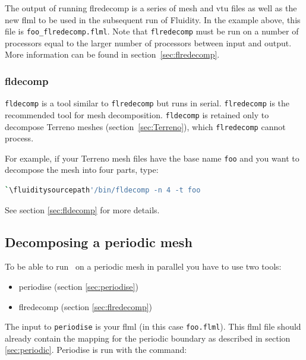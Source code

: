 The output of running flredecomp is a series of mesh and vtu files as well
as the new flml to be used in the subsequent run of Fluidity.  In the example above, this file is \lstinline+foo_flredecomp.flml+. 
Note that \lstinline[language=bash]+flredecomp+ must be run on a number of processors equal to the larger number of processors between input and output.
More information can be found in section~\ref{sec:flredecomp}.

\subsubsection{fldecomp}
\label{mesh!meshing tools!fldecomp}

\lstinline[language=bash]+fldecomp+ is a tool similar to \lstinline[language=bash]+flredecomp+ but runs in serial. \lstinline[language=bash]+flredecomp+ is the recommended tool for mesh decomposition.  \lstinline[language=bash]+fldecomp+ is retained only to decompose Terreno meshes (section~\ref{sec:Terreno}), which \lstinline[language=bash]+flredecomp+ cannot process.

For example, if your Terreno mesh files have the base name \lstinline[language=bash]+foo+ and you want to decompose the mesh into four parts, type:
\begin{lstlisting}[language = Bash]
`\fluiditysourcepath'/bin/fldecomp -n 4 -t foo
\end{lstlisting}
See section \ref{sec:fldecomp} for more details.

\subsection{Decomposing a periodic mesh}
\label{sec:decomposing_meshes_periodise}

To be able to run \fluidity\ on a periodic mesh in parallel you have to use
two tools:

\begin{itemize}
\item periodise (section \ref{sec:periodise})
\item flredecomp (section \ref{sec:flredecomp})
\end{itemize}

The input to \lstinline+periodise+ is your flml (in this case
\lstinline{foo.flml}). This flml file should already contain the mapping for
the periodic boundary as described in section
\ref{sec:periodic}. Periodise is run with the command:

